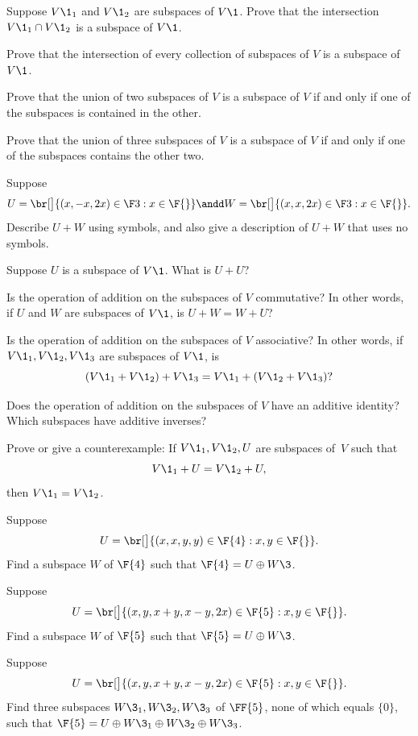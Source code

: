 \exercise
Suppose $V\1_1$ and $V\1_2$ are subspaces of $V\1$. Prove that the intersection $V\1_1 \cap V\1_2$ is a subspace of $V\1$.


\exercise
Prove that the intersection of every collection of subspaces of $V$ is a subspace of $V\1$.


\exercise
Prove that the union of two subspaces of $V$ is a subspace of $V$ if and only if
one of the subspaces is contained in the other. \label{218}


\exercise
Prove that the union of three subspaces of $V$ is a subspace of $V$ if and only if one of the subspaces contains the other two.\label{1threesub}


\exercise
Suppose
\[
U = \br[\big]{ (x, -x, 2x) \in \F3 : x\in \F{}} \andd W = \br[\big]{ (x, x, 2x) \in \F3: x \in \F{}}.
\]
Describe $U+W$ using symbols, and also give a description of $U + W$ that uses no symbols.


\exercise
Suppose $U$ is a subspace of $V\1$.  What is $U + U$?


\exercise
Is the operation of addition on the subspaces of $V$ commutative?
In other words, if $U$ and $W$ are subspaces of $V\1$, is
$U + W = W + U$?


\exercise
Is the operation of addition on the subspaces of $V$ associative?
In other words, if $V\1_1,V\1_2, V\1_3$ are subspaces of $V\1$, is
\[
(V\1_1 + V\1_2) + V\1_3 = V\1_1 + (V\1_2 + V\1_3)?
\]
\exercisedisplayend


\exercise
Does the operation of addition on the subspaces of $V$ have an
additive identity?  Which subspaces have additive inverses?


\exercise
Prove or give a counterexample: If $V\1_1, V\1_2, U$ are subspaces of~$V$ such
that
\[
V\1_1 + U = V\1_2 + U,
\]
then $V\1_1 = V\1_2$.


\exercise
Suppose
\[
U = \br[\big]{(x, x, y, y) \in \F{4}: x, y \in \F{}}.
\]
Find a subspace $W$ of $\F{4}$ such that
$\F{4} = U \oplus W\3$.


\exercise
Suppose
\[
U = \br[\big]{(x, y, x+y, x-y, 2x) \in \F{5}: x, y \in \F{}}.
\]
Find a subspace $W$ of $\F{5}$ such that
$\F{5} = U \oplus W\3$.


\exercise
Suppose
\[
U = \br[\big]{(x, y, x+y, x-y, 2x) \in \F{5}: x, y \in \F{}}.
\]
Find three subspaces $W\3_1, W\3_2, W\3_3$ of $\FF{5}$, none of which equals $\{0\}$, such that
$\F{5} = U \oplus W\3_1 \oplus W\3_2 \oplus W\3_3$.


